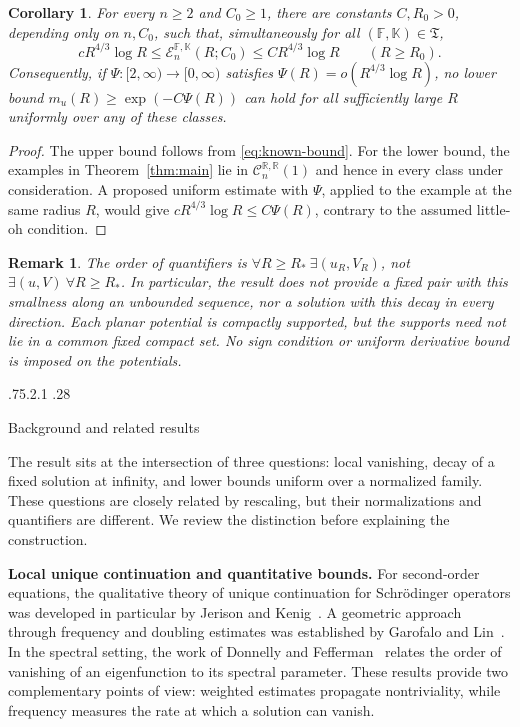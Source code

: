 \documentclass[11pt,a4paper,leqno]{amsart}
\makeatletter
\numberwithin{equation}{section}
\theoremstyle{landisplain}
\newtheorem{corollary}[theorem]{Corollary}
\theoremstyle{landisdefinition}
\theoremstyle{landisremark}
\newtheorem{remark}[theorem]{Remark}
\newcommand{\R}{\mathbb R}
\renewcommand\subsection{\@startsection{subsection}{2}{\z@}%
  {.75\baselineskip \@plus .2\baselineskip \@minus .1\baselineskip}%
  {.28\baselineskip}%
  {\normalfont\bfseries\raggedright}}
\makeatother
\begin{document}
\begin{corollary}\label{cor:sharpness}
For every $n\ge2$ and $C_0\ge1$, there are constants $C,R_0>0$,
depending only on $n,C_0$, such that, simultaneously for all
$(\mathbb F,\mathbb K)\in\mathfrak T$,
\begin{equation}\label{eq:sharp-scale}
 cR^{4/3}\log R
 \le \mathcal E_n^{\mathbb F,\mathbb K}(R;C_0)
 \le CR^{4/3}\log R\qquad(R\ge R_0).
\end{equation}
Consequently, if $\Psi:[2,\infty)\to[0,\infty)$ satisfies
$\Psi(R)=o(R^{4/3}\log R)$, no lower bound
$m_u(R)\ge\exp(-C\Psi(R))$ can hold for all sufficiently large
$R$ uniformly over any of these classes.
\end{corollary}

\begin{proof}
The upper bound follows from \eqref{eq:known-bound}. For the
lower bound, the examples in Theorem~\ref{thm:main} lie in
$\mathcal C_n^{\R,\R}(1)$ and hence in every class under
consideration. A proposed uniform estimate with $\Psi$, applied
to the example at the same radius $R$, would give
$cR^{4/3}\log R\le C\Psi(R)$, contrary to the assumed
little-oh condition.
\end{proof}

\begin{remark}\label{rem:scope}
The order of quantifiers is
$\forall R\ge R_*\ \exists(u_R,V_R)$, not
$\exists(u,V)\ \forall R\ge R_*$. In particular, the result
does not provide a fixed pair with this smallness along an
unbounded sequence, nor a solution with this decay in every
direction. Each planar potential is compactly supported, but the
supports need not lie in a common fixed compact set. No sign
condition or uniform derivative bound is imposed on the potentials.
\end{remark}

\subsection{Background and related results}

The result sits at the intersection of three questions: local
vanishing, decay of a fixed solution at infinity, and lower bounds
uniform over a normalized family. These questions are closely
related by rescaling, but their normalizations and quantifiers
are different. We review the distinction before explaining the
construction.

\smallskip\noindent\textbf{Local unique continuation and quantitative bounds.}
For second-order equations, the qualitative theory of unique
continuation for Schr\"odinger operators was developed in particular
by Jerison and Kenig~\cite{JK}. A geometric approach through
frequency and doubling estimates was established by Garofalo and
Lin~\cite{GL86,GL87}. In the spectral setting, the work of Donnelly
and Fefferman~\cite{DF} relates the order of vanishing of an
eigenfunction to its spectral parameter. These results provide two
complementary points of view: weighted estimates propagate
nontriviality, while frequency measures the rate at which a solution
can vanish.
\end{document}
